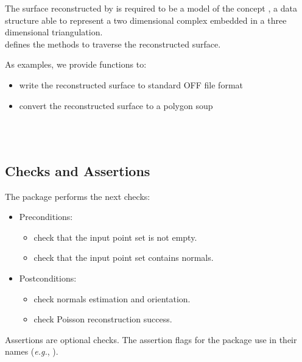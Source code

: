 The surface reconstructed by 
is required to be a model of the concept
,
a data structure able to represent a two dimensional
complex embedded in a three dimensional triangulation. \\
 defines the methods to traverse the reconstructed surface.

As examples, we provide functions to:

\begin{itemize}
\item write the reconstructed surface to standard OFF file format
\item convert the reconstructed surface to a polygon soup
\end{itemize}

  \\
  \\


\subsection{Checks and Assertions}

The package performs the next checks:

\begin{itemize}
\item Preconditions:
    \begin{itemize}
    \item check that the input point set is not empty.
    \item check that the input point set contains normals.
    \end{itemize}
\item Postconditions:
    \begin{itemize}
    \item check normals estimation and orientation.
    \item check Poisson reconstruction success.
    \end{itemize}
\end{itemize}

Assertions are optional checks. The assertion flags for the package
use  in their names (\textit{e.g.},
).


